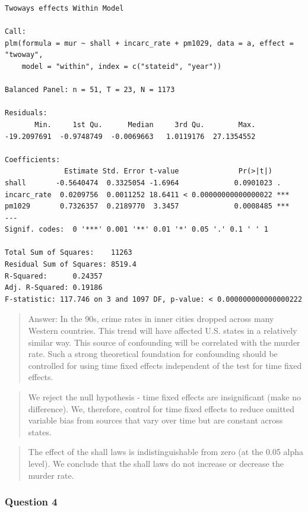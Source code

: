 \documentclass[]{article}
\theoremstyle{definition}
\theoremstyle{definition}
\theoremstyle{definition}
\theoremstyle{remark}
\begin{document}
\begin{verbatim}
Twoways effects Within Model

Call:
plm(formula = mur ~ shall + incarc_rate + pm1029, data = a, effect = "twoway", 
    model = "within", index = c("stateid", "year"))

Balanced Panel: n = 51, T = 23, N = 1173

Residuals:
       Min.     1st Qu.      Median     3rd Qu.        Max. 
-19.2097691  -0.9748749  -0.0069663   1.0119176  27.1354552 

Coefficients:
              Estimate Std. Error t-value              Pr(>|t|)    
shall       -0.5640474  0.3325054 -1.6964             0.0901023 .  
incarc_rate  0.0209756  0.0011252 18.6411 < 0.00000000000000022 ***
pm1029       0.7326357  0.2189770  3.3457             0.0008485 ***
---
Signif. codes:  0 '***' 0.001 '**' 0.01 '*' 0.05 '.' 0.1 ' ' 1

Total Sum of Squares:    11263
Residual Sum of Squares: 8519.4
R-Squared:      0.24357
Adj. R-Squared: 0.19186
F-statistic: 117.746 on 3 and 1097 DF, p-value: < 0.000000000000000222
\end{verbatim}

\begin{quote}
Answer: In the 90s, crime rates in inner cities dropped across many
Western countries. This trend will have affected U.S. states in a
relatively similar way. This source of confounding will be correlated
with the murder rate. Such a strong theoretical foundation for
confounding should be controlled for using time fixed effects
independent of the test for time fixed effects.
\end{quote}

\begin{quote}
We reject the null hypothesis - time fixed effects are insignificant
(make no difference). We, therefore, control for time fixed effects to
reduce omitted variable bias from sources that vary over time but are
constant across states.
\end{quote}

\begin{quote}
The effect of the shall laws is indistinguishable from zero (at the 0.05
alpha level). We conclude that the shall laws do not increase or
decrease the murder rate.
\end{quote}

\subsubsection{Question 4}\label{question-4-1}
\end{document}
